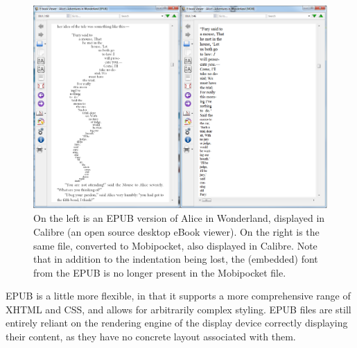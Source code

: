 \begin{figure}[tb]
\includegraphics[width=\textwidth]{gfx/alices1}
\caption[The same document in EPUB and Mobipocket formats, displayed in Calibre]{On the left is an
EPUB version of Alice in Wonderland, displayed in Calibre (an open source desktop eBook viewer). On
the right is the same file, converted to Mobipocket, also displayed in Calibre. Note that in
addition to the indentation being lost, the (embedded) font from the EPUB is no longer present in
the Mobipocket file.}
\label{alices1}
\end{figure}


EPUB is a little more flexible, in that it supports a more comprehensive range of XHTML and CSS, and
allows for arbitrarily complex styling. EPUB files are still entirely reliant on the rendering
engine of the display device correctly displaying their content, as they have no concrete layout
associated with them.

